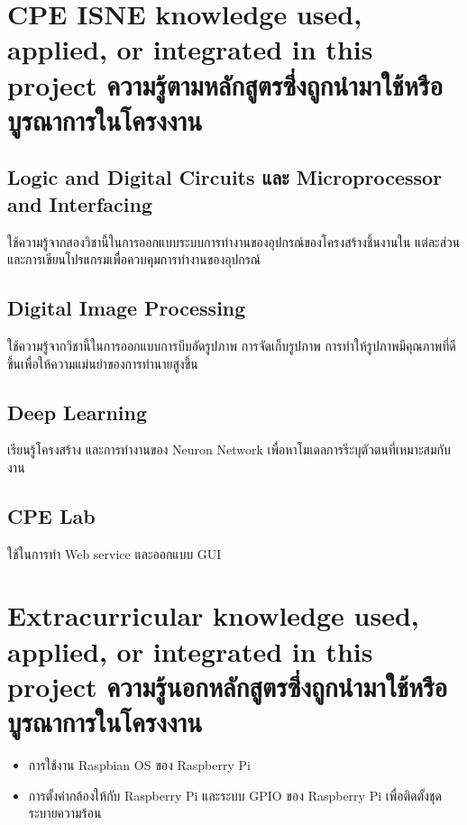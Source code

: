 \section{\ifenglish%
\ifcpe CPE \else ISNE \fi knowledge used, applied, or integrated in this project
\else%
ความรู้ตามหลักสูตรซึ่งถูกนำมาใช้หรือบูรณาการในโครงงาน
\fi
}

\subsection{Logic and Digital Circuits และ Microprocessor and Interfacing}

ใช้ความรู้จากสองวิชานี้ในการออกแบบระบบการทำงานของอุปกรณ์ของโครงสร้างชิ้นงานใน
แต่ละส่วน และการเขียนโปรแกรมเพื่อควบคุมการทำงานของอุปกรณ์

\subsection{Digital Image Processing}

ใช้ความรู้จากวิชานี้ในการออกแบบการบีบอัดรูปภาพ การจัดเก็บรูปภาพ การทำให้รูปภาพมีคุณภาพที่ดีขึ้นเพื่อให้ความแม่นยำของการทำนายสูงขึ้น

\subsection{Deep Learning}
เรียนรู้โครงสร้าง และการทำงานของ Neuron Network เพื่อหาโมเดลการรีะบุตัวตนที่เหมาะสมกับงาน

\subsection{CPE Lab}
ใช้ในการทำ Web service และออกแบบ GUI

\section{\ifenglish%
Extracurricular knowledge used, applied, or integrated in this project
\else%
ความรู้นอกหลักสูตรซึ่งถูกนำมาใช้หรือบูรณาการในโครงงาน
\fi
}
\begin{itemize}
  \item การใช้งาน Raspbian OS ของ Raspberry Pi
  \item การตั้งค่ากล้องให้กับ Raspberry Pi และระบบ GPIO ของ Raspberry Pi เพื่อติดตั้งชุดระบายความร้อน
\end{itemize}



